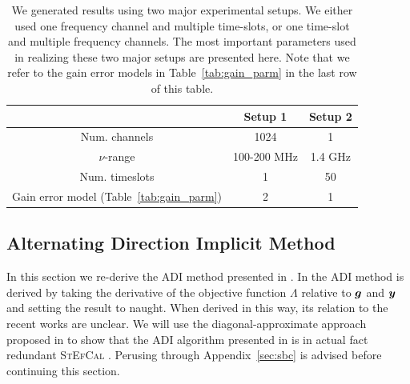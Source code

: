 \documentclass[useAMS,usenatbib]{mn2e}
\newcommand{\bg}{\bmath{g}}
\newcommand{\by}{\bmath{y}}
\begin{document}
\begin{table}
\centering
\caption{We generated results using two major experimental setups. We either used one frequency channel and multiple time-slots, or one time-slot and multiple frequency 
channels. The most important parameters used in realizing these two major setups are presented here. Note that we refer to the gain error models in Table~\ref{tab:gain_parm} in the 
last row of this table.}
\begin{tabular}{|c c c|} 
\hline
 & Setup 1 & Setup 2\\
\hline
\hline
 Num. channels & 1024 & 1\\
$\nu$-range & 100-200 MHz & 1.4 GHz\\
Num. timeslots & 1 & 50\\
Gain error model (Table~\ref{tab:gain_parm}) & 2 & 1\\
\hline
\end{tabular}
\label{tab:ch_parm}
\end{table}

\subsection{Alternating Direction Implicit Method}
\label{sec:adi}
In this section we re-derive the ADI method presented in \citet{Marthi2014}. In \citet{Marthi2014} the ADI method is derived by taking the derivative of the 
objective function $\Lambda$ relative to $\bg$ and $\by$ and setting the result to naught. When derived in this way, its relation to the recent works \citep{Salvini2014,Smirnov2015} are unclear.
We will use the diagonal-approximate approach proposed in \citet{Smirnov2015} to show that the ADI algorithm presented in \citet{Marthi2014} is in actual fact redundant 
\textsc{StEfCal} \citep{Salvini2014}. Perusing through Appendix~\ref{sec:sbc} is advised before continuing this section.
\end{document}
